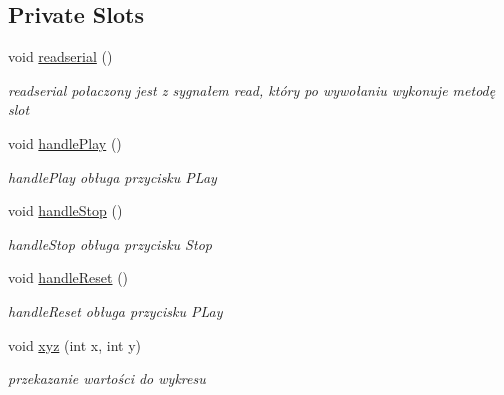 \subsection*{Private Slots}
\begin{DoxyCompactItemize}
\item 
\mbox{\label{classMainWindow_a3ae46800a65ccfe4467ccff0da526e57}} 
void \hyperlink{classMainWindow_a3ae46800a65ccfe4467ccff0da526e57}{readserial} ()
\begin{DoxyCompactList}\small\item\em readserial połaczony jest z sygnałem read, który po wywołaniu wykonuje metodę slot \end{DoxyCompactList}\item 
\mbox{\label{classMainWindow_aa2f20eff28cfa46cda4f0e6d26f9786a}} 
void \hyperlink{classMainWindow_aa2f20eff28cfa46cda4f0e6d26f9786a}{handle\+Play} ()
\begin{DoxyCompactList}\small\item\em handle\+Play obługa przycisku P\+Lay \end{DoxyCompactList}\item 
\mbox{\label{classMainWindow_aae0a812a7ffebdce14b504f1d3e722c7}} 
void \hyperlink{classMainWindow_aae0a812a7ffebdce14b504f1d3e722c7}{handle\+Stop} ()
\begin{DoxyCompactList}\small\item\em handle\+Stop obługa przycisku Stop \end{DoxyCompactList}\item 
\mbox{\label{classMainWindow_afd15849018e00f45a44f404dd0805f72}} 
void \hyperlink{classMainWindow_afd15849018e00f45a44f404dd0805f72}{handle\+Reset} ()
\begin{DoxyCompactList}\small\item\em handle\+Reset obługa przycisku P\+Lay \end{DoxyCompactList}\item 
\mbox{\label{classMainWindow_a24619cb8a370a51a5ec7549c497cd112}} 
void \hyperlink{classMainWindow_a24619cb8a370a51a5ec7549c497cd112}{xyz} (int x, int y)
\begin{DoxyCompactList}\small\item\em przekazanie wartości do wykresu \end{DoxyCompactList}\end{DoxyCompactItemize}
